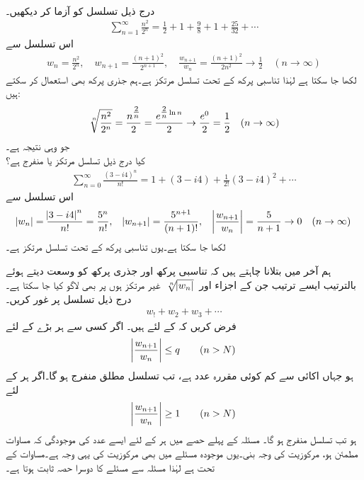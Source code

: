 \quad {}\\
درج ذیل تسلسل کو آزما کر دیکھیں۔
\begin{align*}
\sum_{n=1}^{\infty} \frac{n^2}{2^n}=\frac{1}{2}+1+\frac{9}{8}+1+\frac{25}{32}+\cdots
\end{align*}
اس تسلسل سے 
\begin{align*}
w_n=\frac{n^2}{2^n}, \quad w_{n+1}=\frac{(n+1)^2}{2^{n+1}},\quad \frac{w_{n+1}}{w_n}=\frac{(n+1)^2}{2n^2}\to \frac{1}{2}\quad (n\to\infty)
\end{align*}
لکھا جا سکتا ہے لہٰذا تناسبی پرکھ کے تحت تسلسل مرتکز ہے۔ہم جذری پرکھ بھی استعمال کر سکتے ہیں:
\begin{align*}
\sqrt[\leftroot{-2}n]{\frac{n^2}{2^n}}=\frac{n^{\tfrac{2}{n}}}{2}=\frac{e^{\tfrac{2}{n}\ln n}}{2}\to \frac{e^0}{2}=\frac{1}{2}\quad (n\to\infty)
\end{align*}
جو وہی نتیجہ ہے۔ 
\quad {}\\
کیا درج ذیل تسلسل مرتکز یا منفرج ہے؟
\begin{align*}
\sum_{n=0}^{\infty}\frac{(3-i4)^n}{n!}=1+(3-i4)+\frac{1}{2!}(3-i4)^2+\cdots
\end{align*}
اس تسلسل سے 
\begin{align*}
\abs{w_n}=\frac{\abs{3-i4}^n}{n!}=\frac{5^n}{n!}, \quad \abs{w_{n+1}}=\frac{5^{n+1}}{(n+1)!},\quad \abs{\frac{w_{n+1}}{w_n}}=\frac{5}{n+1}\to 0 \quad (n\to \infty)
\end{align*}
لکھا جا سکتا ہے۔یوں تناسبی پرکھ کے تحت تسلسل مرتکز ہے۔

ہم آخر میں بتلانا چاہتے ہیں کہ تناسبی پرکھ اور جذری پرکھ کو وسعت دیتے ہوئے بالترتیب  ایسے ترتیب جن کے اجزاء  اور 
$\,\sqrt[\leftroot{-2}n]{\abs{w_n}}\,$
غیر مرتکز ہوں پر بھی لاگو کیا جا سکتا ہے۔
\quad {}\\
درج ذیل تسلسل پر غور کریں۔
\begin{align*}
w_!+w_2+w_3+\cdots
\end{align*}
فرض کریں کہ  کے لئے  ہیں۔ اگر کسی  سے ہر بڑے  کے لئے
\begin{align}\label{مساوات_ترتیب_تناسبی_الف}
\abs{\frac{w_{n+1}}{w_n}}\le q\quad \quad (n>N)
\end{align}
ہو جہاں  اکائی سے کم کوئی مقررہ عدد ہے، تب تسلسل مطلق منفرج ہو گا۔اگر ہر  کے لئے 
\begin{align}\label{مساوات_ترتیب_تناسبی_ب}
\abs{\frac{w_{n+1}}{w_n}}\ge 1\quad \quad (n>N)
\end{align}
ہو تب تسلسل منفرج ہو گا۔
\quad
مسئلہ  کے پہلے حصے میں ہر  کے لئے ایسے عدد  کی موجودگی  کہ مساوات  مطمئن ہو، مرکوزیت کی وجہ بنی۔یوں موجودہ مسئلے میں بھی مرکوزیت کی یہی وجہ ہے۔مساوات  کے تحت  ہے لہٰذا   مسئلہ سے مسئلے کا دوسرا حصہ ثابت ہوتا ہے۔

